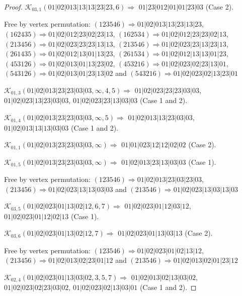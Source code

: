 \documentclass[12pt]{article}
\theoremstyle{plain}
\theoremstyle{definition}
\theoremstyle{remark}
\newcommand{\fancy}[1]{\mathcal{#1}}
\def\K{\fancy{K}}
\begin{document}
\begin{proof}
	$\K_{03,1}(01|02|013|13|13|23|23,6)\Rightarrow $ $01|23|012|01|01|23|03$ (Case 2).
	
	
	
	Free by vertex permutation: $(1 2 3 5 4 6)\Rightarrow 01|02|013|13|23|13|23$, $(1 6 2 4 3 5)\Rightarrow 01|02|012|23|02|23|13$, $(1 6 2 5 3 4)\Rightarrow 01|02|012|23|23|02|13$, $(2 1 3 4 5 6)\Rightarrow 01|02|023|23|23|13|13$, $(2 1 3 5 4 6)\Rightarrow 01|02|023|23|13|23|13$, $(2 6 1 4 3 5)\Rightarrow 01|02|012|13|01|13|23$, $(2 6 1 5 3 4)\Rightarrow 01|02|012|13|13|01|23$, $(4 5 3 1 2 6)\Rightarrow 01|02|013|01|13|23|02$, $(4 5 3 2 1 6)\Rightarrow 01|02|023|02|23|13|01$, $(5 4 3 1 2 6)\Rightarrow 01|02|013|01|23|13|02$ and $(5 4 3 2 1 6)\Rightarrow 01|02|023|02|13|23|01$
	
	
	
	\bigskip
	
	$\K_{01,3}(01|02|013|23|23|03|03,\infty,4, 5)\Rightarrow $ $01|02|023|23|23|03|03$, $01|02|023|13|23|03|03$, $01|02|023|23|13|03|03$ (Case 1 and 2).
	
	$\K_{01,4}(01|02|013|23|23|03|03,\infty,5)\Rightarrow $ $01|02|013|13|23|03|03$, $01|02|013|13|13|03|03$ (Case 1 and 2).
	
	$\K_{01,1}(01|02|013|23|23|03|03,\infty)\Rightarrow $ $01|01|023|12|12|02|02$ (Case 2).
	
	$\K_{01,5}(01|02|013|23|23|03|03,\infty)\Rightarrow $ $01|02|013|23|13|03|03$ (Case 1).
	
	
	
	Free by vertex permutation: $(1 2 3 5 4 6)\Rightarrow 01|02|013|23|03|23|03$, $(2 1 3 4 5 6)\Rightarrow 01|02|023|13|13|03|03$ and $(2 1 3 5 4 6)\Rightarrow 01|02|023|13|03|13|03$
	
	
	
	\bigskip
	
	$\K_{03,5}(01|02|023|01|13|02|12,6, 7)\Rightarrow $ $01|02|023|01|12|03|12$, $01|02|023|01|12|02|13$ (Case 1).
	
	$\K_{03,6}(01|02|023|01|13|02|12,7)\Rightarrow $ $01|02|023|01|13|03|13$ (Case 2).
	
	
	
	Free by vertex permutation: $(1 2 3 5 4 6)\Rightarrow 01|02|023|01|02|13|12$, $(2 1 3 4 5 6)\Rightarrow 01|02|013|02|23|01|12$ and $(2 1 3 5 4 6)\Rightarrow 01|02|013|02|01|23|12$
	
	
	
	\bigskip
	
	$\K_{02,4}(01|02|023|01|13|03|02,3, 5, 7)\Rightarrow $ $01|02|013|02|13|03|02$, $01|02|023|02|23|03|02$, $01|02|023|02|13|03|01$ (Case 1 and 2).
	

\end{proof}
\end{document}
